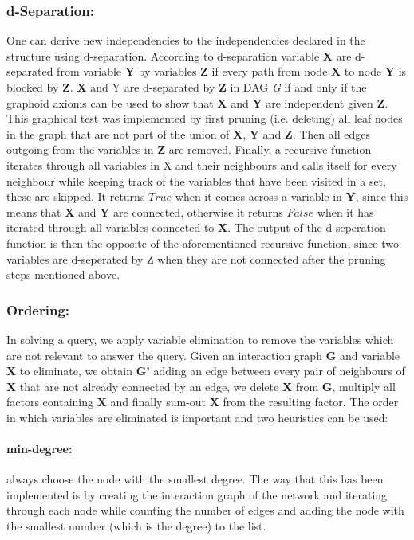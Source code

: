 \subsubsection{d-Separation:} %
One can derive new independencies to the independencies declared in the structure using d-separation. According to d-separation variable \textbf{X} are d-separated from variable \textbf{Y} by variables \textbf{Z} if every path from node \textbf{X} to node \textbf{Y} is blocked by \textbf{Z}. \textbf{X} and Y are d-separated by \textbf{Z} in DAG \textit{G} if and only if the graphoid axioms can be used to show that \textbf{X} and \textbf{Y} are independent given \textbf{Z}.  
\\
This graphical test was implemented by first pruning (i.e. deleting) all leaf nodes in the graph that are not part of the union of \textbf{X}, \textbf{Y} and \textbf{Z}. Then all edges outgoing from the variables in \textbf{Z} are removed. Finally, a recursive function iterates through all variables in X and their neighbours and calls itself for every neighbour while keeping track of the variables that have been visited in a set, these are skipped. It returns $True$ when it comes across a variable in \textbf{Y}, since this means that \textbf{X} and \textbf{Y} are connected, otherwise it returns $False$ when it has iterated through all variables connected to \textbf{X}. The output of the d-seperation function is then the opposite of the aforementioned recursive function, since two variables are d-seperated by Z when they are not connected after the pruning steps mentioned above.

\subsubsection{Ordering:} In solving a query, we apply variable elimination to remove the variables which are not relevant to answer the query. Given an interaction graph \textbf{G} and variable \textbf{X} to eliminate, we obtain \textbf{G'} adding an edge between every pair of neighbours of \textbf{X} that are not already connected by an edge, we delete \textbf{X} from \textbf{G}, multiply all factors containing \textbf{X} and finally sum-out \textbf{X} from the resulting factor. The order in which variables are eliminated is important and two heuristics can be used: 

\paragraph{min-degree:} always choose the node with the smallest degree. The way that this has been implemented is by creating the interaction graph of the network and iterating through each node while counting the number of edges and adding the node with the smallest number (which is the degree) to the list. 

